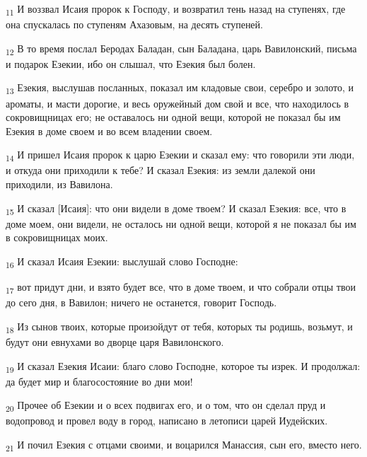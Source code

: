 \begin{tcolorbox}
\textsubscript{11} И воззвал Исаия пророк к Господу, и возвратил тень назад на ступенях, где она спускалась по ступеням Ахазовым, на десять ступеней.
\end{tcolorbox}
\begin{tcolorbox}
\textsubscript{12} В то время послал Беродах Баладан, сын Баладана, царь Вавилонский, письма и подарок Езекии, ибо он слышал, что Езекия был болен.
\end{tcolorbox}
\begin{tcolorbox}
\textsubscript{13} Езекия, выслушав посланных, показал им кладовые свои, серебро и золото, и ароматы, и масти дорогие, и весь оружейный дом свой и все, что находилось в сокровищницах его; не оставалось ни одной вещи, которой не показал бы им Езекия в доме своем и во всем владении своем.
\end{tcolorbox}
\begin{tcolorbox}
\textsubscript{14} И пришел Исаия пророк к царю Езекии и сказал ему: что говорили эти люди, и откуда они приходили к тебе? И сказал Езекия: из земли далекой они приходили, из Вавилона.
\end{tcolorbox}
\begin{tcolorbox}
\textsubscript{15} И сказал [Исаия]: что они видели в доме твоем? И сказал Езекия: все, что в доме моем, они видели, не осталось ни одной вещи, которой я не показал бы им в сокровищницах моих.
\end{tcolorbox}
\begin{tcolorbox}
\textsubscript{16} И сказал Исаия Езекии: выслушай слово Господне:
\end{tcolorbox}
\begin{tcolorbox}
\textsubscript{17} вот придут дни, и взято будет все, что в доме твоем, и что собрали отцы твои до сего дня, в Вавилон; ничего не останется, говорит Господь.
\end{tcolorbox}
\begin{tcolorbox}
\textsubscript{18} Из сынов твоих, которые произойдут от тебя, которых ты родишь, возьмут, и будут они евнухами во дворце царя Вавилонского.
\end{tcolorbox}
\begin{tcolorbox}
\textsubscript{19} И сказал Езекия Исаии: благо слово Господне, которое ты изрек. И продолжал: да будет мир и благосостояние во дни мои!
\end{tcolorbox}
\begin{tcolorbox}
\textsubscript{20} Прочее об Езекии и о всех подвигах его, и о том, что он сделал пруд и водопровод и провел воду в город, написано в летописи царей Иудейских.
\end{tcolorbox}
\begin{tcolorbox}
\textsubscript{21} И почил Езекия с отцами своими, и воцарился Манассия, сын его, вместо него.
\end{tcolorbox}
